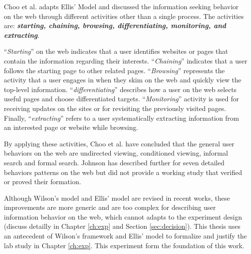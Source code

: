 Choo et al. adapts Ellis' Model and discussed \cite{choo1999information}
the information seeking behavior on the web through different activities other than 
a single process. The activities are:
\textbf{\emph{starting, chaining, browsing, differentiating, monitoring, and extracting}}.

``\emph{Starting}'' on the web indicates that a user identifies websites or pages
that contain the information regarding their interests.
``\emph{Chaining}'' indicates that a user follows the starting page to other related pages.
``\emph{Browsing}'' represents the activity that a user engages in when they skim on the web
and quickly view the top-level information. 
``\emph{differentiating}'' describes how a user on the web selects useful pages 
and choose differentiated targets.
``\emph{Monitoring}'' activity is used for receiving updates on the sites or for revisiting
the previously visited pages. Finally, ``\emph{extracting}'' refers to a user
systematically extracting information from an interested page or website while browsing.

By applying these activities, Choo et al. \cite{choo1999information} 
have concluded that the general user behaviors 
on the web are undirected viewing, conditioned viewing, informal search and formal search.
Johnson has described further \cite{johnson2017patterns} for seven detailed behaviors 
patterns on the web but did not provide a working study that verified or proved their formation.

Although Wilson's model and Ellis' model are revised in recent works, these improvements
are more generic and are too complex for describing user information behavior on the web,
which cannot adapts to the experiment design (discuss detailly in Chapter \ref{ch:exp}
and Section \ref{sec:decision}).
This thesis uses an antecedent of Wilson's framework \cite{wilson1997information} and 
Ellis' model \cite{ellis1997modelling} to formalize and justify the lab study 
in Chapter \ref{ch:exp}. This experiment form the foundation of this work.

\cleardoublepage